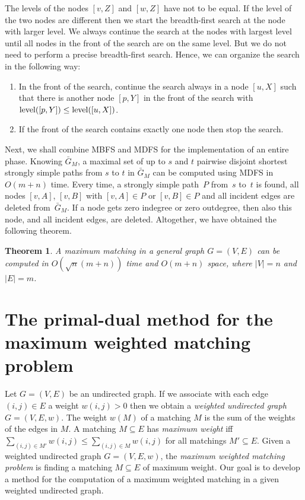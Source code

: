 \documentclass[12pt,twoside,a4paper]{article}
\newtheorem{theo}{Theorem}
\def\lev{{\rm level}}
\begin{document}
The levels of the nodes $[v,Z]$ and $[w,Z]$ have not to be equal. If the level of the 
two nodes are different then we start the breadth-first search at the node with 
larger level. We always continue the search at the nodes with largest level
until all nodes in the front of the search are on the same level. But we do not need
to perform a precise breadth-first search. Hence, we can organize the search in the following way:
\begin{enumerate}
\item
In the front of the search, continue the search always in a node $[u,X]$ such that
there is another node $[p,Y]$ in the front of the search with $\lev([p,Y]) \leq \lev([u,X])$.
\item
If the front of the search contains exactly one node then stop the search.
\end{enumerate}
Next, we shall combine MBFS and MDFS for the implementation of an entire phase.
Knowing $\bar{G}_M$, a maximal set of up to $s$ and $t$ pairwise disjoint shortest
strongly simple paths from $s$ to $t$ in $\bar{G}_M$ can be computed using MDFS in $O(m + n)$ 
time. Every time, a strongly simple path~$P$ from~$s$ to~$t$ is found, all
nodes $[v,A]$, $[v,B]$ with $[v,A]\in P$ or $[v,B]\in P$ and all incident edges
are deleted from~$\bar{G}_M$. If a node gets zero indegree or zero
outdegree, then also this node, and all incident edges, are deleted.
Altogether, we have obtained the following theorem.

\begin{theo}
A maximum matching in a general graph $G=(V,E)$ can be computed in
$O(\sqrt{n} (m + n))$ time and $O(m+n)$ space, where 
$\left|V\right| = n$ and $\left| E\right| = m$.
\end{theo}

\section{The primal-dual method for the \\maximum weighted matching problem}

Let $G =(V,E)$ be an undirected graph. 
If we associate with each edge $(i,j) \in E$ a weight $w(i,j) > 0$ then we
obtain a {\em weighted undirected graph\/} $G = (V,E,w)$.
The weight $w(M)$ of a matching $M$ is the sum of the weights of the edges in
$M$. A matching $M \subseteq E$ has {\em maximum weight\/} iff  $\sum_{(i,j) 
\in M'}w(i,j) \leq \sum_{(i,j) \in M}w(i,j)$ for all matchings
$M' \subseteq E$.
Given a weighted undirected graph $G = (V,E,w)$, the {\em maximum weighted
matching problem\/} is finding a matching $M \subseteq E$ of maximum weight.
Our goal is to develop a method for the computation of a maximum weighted 
matching in a given weighted undirected graph.
\end{document}
